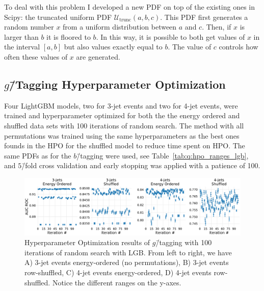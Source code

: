 To deal with this problem I developed a new PDF on top of the existing ones in Scipy: the truncated uniform PDF $\mathcal{U}_\mathrm{trunc}(a, b, c)$. This PDF first generates a random number $x$ from a uniform distribution between $a$ and $c$. Then, if $x$ is larger than $b$ it is floored to $b$. In this way, it is possible to both get values of $x$ in the interval $[a, b]$ but also values exactly equal to $b$. The value of $c$ controls how often these  values of $x$ are generated.

\subsection{$g$\=/Tagging Hyperparameter Optimization}

Four LightGBM models, two for 3-jet events and two for 4-jet events, were trained and hyperparameter optimized for both the the energy ordered and shuffled data sets with \num{100} iterations of random search. The method with all permutations was trained using the same hyperparameters as the best ones founds in the HPO for the shuffled model to reduce time spent on HPO. The same PDFs as for the $b$\=/tagging were used, see Table~\ref{tab:q:hpo_ranges_lgb}, and $5$\=/fold cross validation and early stopping was applied with a patience of \num{100}. 

\begin{figure}[h!]%
  \centerfloat
  \includegraphics[width=1\textwidth, trim=0 0 0 0, clip]{figures/quarks/cv_res_lgb-gtag-down_sample=1.00-ML_vars=vertex-selection=b-ejet_min=4-n_iter_RS_lgb=99-n_iter_RS_xgb=9-cdot_cut=0.90-version=19.pdf}
  \vspace{3mm}
  \caption[Hyperparameter Optimization of $g$\=/Tagging]{
    Hyperparameter Optimization results of $g$\=/tagging with \num{100} iterations of random search with LGB. From left to right, we have A) 3-jet events energy-ordered (no permutations), B) 3-jet events row-shuffled, C) 4-jet events energy-ordered, D) 4-jet events row-shuffled. Notice the different ranges on the y-axes.}
  \label{fig:q:CV_res_iterations_g_tagging}%
\end{figure}
\vspace{-3mm}

